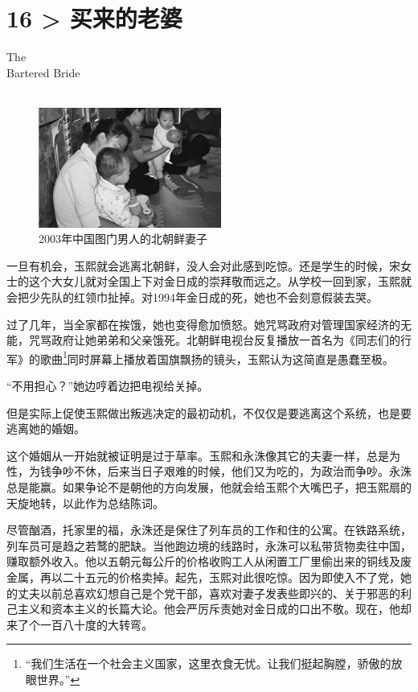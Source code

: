 \chapter*{16 > 买来的老婆}
\vspace{15mm}
\begin{flushright}
	\textcolor{PinYinColor}{\EN \huge{The\\
			Bartered Bride\\
			\ \\}}
\end{flushright}

\begin{figure}[!htbp]
	\centering
	\includegraphics[width=6cm]{./Chapters/Images/16.jpg}
	\caption*{2003年中国图门男人的北朝鲜妻子}
\end{figure}

一旦有机会，玉熙就会逃离北朝鲜，没人会对此感到吃惊。还是学生的时候，宋女士的这个大女儿就对全国上下对金日成的崇拜敬而远之。从学校一回到家，玉熙就会把少先队的红领巾扯掉。对1994年金日成的死，她也不会刻意假装去哭。

过了几年，当全家都在挨饿，她也变得愈加愤怒。她咒骂政府对管理国家经济的无能，咒骂政府让她弟弟和父亲饿死。北朝鲜电视台反复播放一首名为《同志们的行军》的歌曲\footnote{“我们生活在一个社会主义国家，这里衣食无忧。让我们挺起胸膛，骄傲的放眼世界。”}同时屏幕上播放着国旗飘扬的镜头，玉熙认为这简直是愚蠢至极。

“不用担心？”她边哼着边把电视给关掉。

但是实际上促使玉熙做出叛逃决定的最初动机，不仅仅是要逃离这个系统，也是要逃离她的婚姻。

这个婚姻从一开始就被证明是过于草率。玉熙和永洙像其它的夫妻一样，总是为性，为钱争吵不休，后来当日子艰难的时候，他们又为吃的，为政治而争吵。永洙总是能赢。如果争论不是朝他的方向发展，他就会给玉熙个大嘴巴子，把玉熙扇的天旋地转，以此作为总结陈词。

尽管酗酒，托家里的福，永洙还是保住了列车员的工作和住的公寓。在铁路系统，列车员可是趋之若鹜的肥缺。当他跑边境的线路时，永洙可以私带货物卖往中国，赚取额外收入。他以五朝元每公斤的价格收购工人从闲置工厂里偷出来的铜线及废金属，再以二十五元的价格卖掉。起先，玉熙对此很吃惊。因为即使入不了党，她的丈夫以前总喜欢幻想自己是个党干部，喜欢对妻子发表些即兴的、关于邪恶的利己主义和资本主义的长篇大论。他会严厉斥责她对金日成的口出不敬。现在，他却来了个一百八十度的大转弯。


